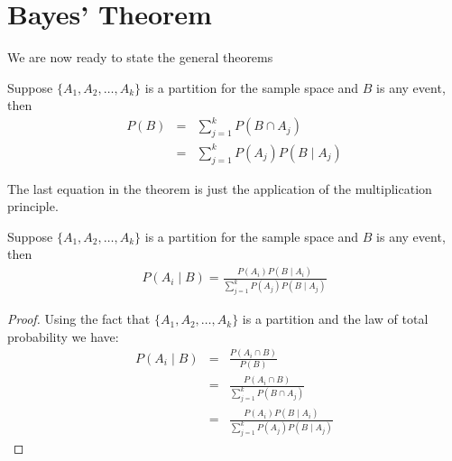 \section{Bayes' Theorem}
We are now ready to state the general theorems  
\begin{thm}
Suppose $\{A_1, A_2, \dots, A_k\}$ is a partition for the sample space and $B$ is any event, then
\begin{eqnarray*}
    P(B) &=& \sum_{j=1}^k P(B\cap A_j)\\
    &=&\sum_{j=1}^k P(A_j) P(B \mid A_j)
\end{eqnarray*}
\end{thm}
The last equation in the theorem is just the application of the multiplication principle. 


\begin{thm}
    Suppose $\{A_1, A_2, \dots, A_k\}$ is a partition for the sample space and $B$ is any event, then
\begin{eqnarray*}
    P(A_i \mid B) = \frac{P(A_i)P(B\mid A_i)}{\sum_{j=1}^k P(A_j) P(B \mid A_j)}
\end{eqnarray*}
\end{thm}
\begin{proof}
Using the fact that $\{A_1, A_2, \dots, A_k\}$ is a partition and the law of total probability we have:
    \begin{eqnarray*}
    P(A_i \mid B) &=& \frac{P(A_i \cap B)}{P(B)}\\
    &=& \frac{P(A_i \cap B) }{\sum_{j=1}^k P(B\cap A_j)}\\
    &=&\frac{P(A_i)P(B\mid A_i)}{\sum_{j=1}^k P(A_j) P(B \mid A_j)}
\end{eqnarray*}
\end{proof}


